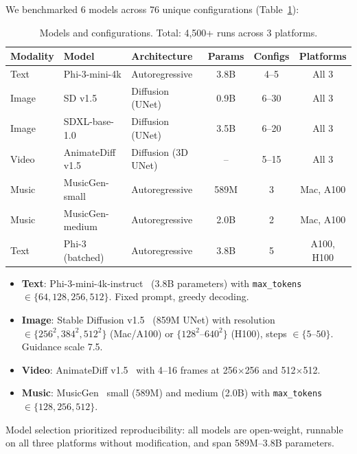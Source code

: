 \documentclass[acmlarge,manuscript,screen,review]{acmart}
\begin{document}
We benchmarked 6 models across 76 unique configurations (Table~\ref{tab:models}):

\begin{table}[t]
\centering
\caption{Models and configurations. Total: 4,500+ runs across 3 platforms.}
\label{tab:models}
\small
\begin{tabular}{@{}lllccc@{}}
\toprule
\textbf{Modality} & \textbf{Model} & \textbf{Architecture} & \textbf{Params} & \textbf{Configs} & \textbf{Platforms} \\
\midrule
Text & Phi-3-mini-4k & Autoregressive & 3.8B & 4--5 & All 3 \\
Image & SD v1.5 & Diffusion (UNet) & 0.9B & 6--30 & All 3 \\
Image & SDXL-base-1.0 & Diffusion (UNet) & 3.5B & 6--20 & All 3 \\
Video & AnimateDiff v1.5 & Diffusion (3D UNet) & -- & 5--15 & All 3 \\
Music & MusicGen-small & Autoregressive & 589M & 3 & Mac, A100 \\
Music & MusicGen-medium & Autoregressive & 2.0B & 2 & Mac, A100 \\
Text & Phi-3 (batched) & Autoregressive & 3.8B & 5 & A100, H100 \\
\bottomrule
\end{tabular}
\end{table}

\begin{itemize}[leftmargin=*]
\item \textbf{Text}: Phi-3-mini-4k-instruct~\cite{abdin2024phi3} (3.8B parameters) with \texttt{max\_tokens} $\in \{64, 128, 256, 512\}$. Fixed prompt, greedy decoding.
\item \textbf{Image}: Stable Diffusion v1.5~\cite{rombach2022high} (859M UNet) with resolution $\in \{256^2, 384^2, 512^2\}$ (Mac/A100) or $\{128^2$--$640^2\}$ (H100), steps $\in \{5$--$50\}$. Guidance scale 7.5.
\item \textbf{Video}: AnimateDiff v1.5~\cite{guo2024animatediff} with 4--16 frames at 256$\times$256 and 512$\times$512.
\item \textbf{Music}: MusicGen~\cite{copet2024musicgen} small (589M) and medium (2.0B) with \texttt{max\_tokens} $\in \{128, 256, 512\}$.
\end{itemize}

Model selection prioritized reproducibility: all models are open-weight, runnable on all three platforms without modification, and span 589M--3.8B parameters.
\end{document}
